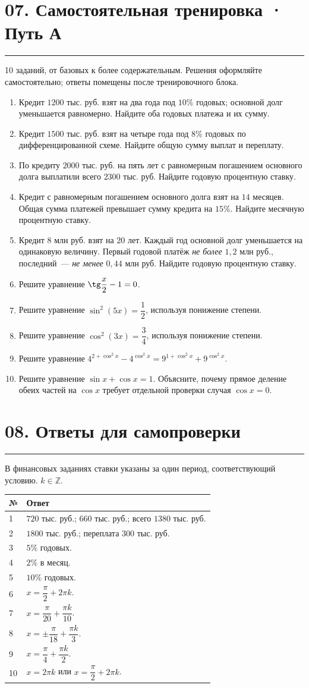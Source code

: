 \documentclass[a4paper,12pt]{article}
\newcommand{\sectionnote}[1]{{\small\color{softgray}#1\par}}
\newcommand{\lessonsection}[1]{\Needspace{5\baselineskip}\section*{\color{darkaccent}#1}\vspace{-5pt}\noindent\textcolor{accent}{\rule{25mm}{0.7pt}}\par\vspace{1pt}}
\begin{document}
\clearpage
\lessonsection{07. Самостоятельная тренировка · Путь А}
\sectionnote{10 заданий, от базовых к более содержательным. Решения оформляйте самостоятельно; ответы помещены после тренировочного блока.}
\begin{enumerate}[label=\textbf{\arabic*.},itemsep=12pt]
\item Кредит \(1200\) тыс. руб. взят на два года под \(10\%\) годовых; основной долг уменьшается равномерно. Найдите оба годовых платежа и их сумму.
\item Кредит \(1500\) тыс. руб. взят на четыре года под \(8\%\) годовых по дифференцированной схеме. Найдите общую сумму выплат и переплату.
\item По кредиту \(2000\) тыс. руб. на пять лет с равномерным погашением основного долга выплатили всего \(2300\) тыс. руб. Найдите годовую процентную ставку.
\item Кредит с равномерным погашением основного долга взят на \(14\) месяцев. Общая сумма платежей превышает сумму кредита на \(15\%\). Найдите месячную процентную ставку.
\item Кредит \(8\) млн руб. взят на \(20\) лет. Каждый год основной долг уменьшается на одинаковую величину. Первый годовой платёж \emph{не более} \(1{,}2\) млн руб., последний~--- \emph{не менее} \(0{,}44\) млн руб. Найдите годовую процентную ставку.
\item Решите уравнение \(\tg\dfrac x2-1=0\).
\item Решите уравнение \(\sin^2(5x)=\dfrac12\), используя понижение степени.
\item Решите уравнение \(\cos^2(3x)=\dfrac34\), используя понижение степени.
\item Решите уравнение \(4^{2+\cos^2 x}-4^{\cos^2 x}=9^{1+\cos^2 x}+9^{\cos^2 x}\).
\item Решите уравнение \(\sin x+\cos x=1\). Объясните, почему прямое деление обеих частей на \(\cos x\) требует отдельной проверки случая \(\cos x=0\).
\end{enumerate}

\clearpage
\lessonsection{08. Ответы для самопроверки}
\sectionnote{В финансовых заданиях ставки указаны за один период, соответствующий условию. \(k\in\mathbb Z\).}
\renewcommand{\arraystretch}{1.65}
\begin{tabularx}{\linewidth}{@{}p{13mm}X@{}}
\toprule
\textbf{№} & \textbf{Ответ}\\
\midrule
1 & \(720\) тыс. руб.; \(660\) тыс. руб.; всего \(1380\) тыс. руб.\\
2 & \(1800\) тыс. руб.; переплата \(300\) тыс. руб.\\
3 & \(5\%\) годовых.\\
4 & \(2\%\) в месяц.\\
5 & \(10\%\) годовых.\\
6 & \(x=\dfrac\pi2+2\pi k\).\\
7 & \(x=\dfrac\pi{20}+\dfrac{\pi k}{10}\).\\
8 & \(x=\pm\dfrac\pi{18}+\dfrac{\pi k}{3}\).\\
9 & \(x=\dfrac\pi4+\dfrac{\pi k}{2}\).\\
10 & \(x=2\pi k\) или \(x=\dfrac\pi2+2\pi k\).\\
\bottomrule
\end{tabularx}
\end{document}
